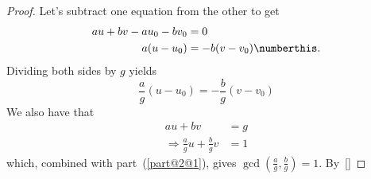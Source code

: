 \documentclass[
  coursecode={MTHE 418},
  assignmentname={Homework \homeworknumber},
  studentnumber=20053722,
  name={Bryan Hoang},
  draft,
]{
  ltxanswer%
}
\begin{document}
\begin{questions}
\begin{parts}
      \part{}
      \begin{solution}

      \end{solution}

      \part{}
      \begin{solution}
        \begin{proof}
          Let's subtract one equation from the other to get
          \begin{align*}
            au + bv - au_{0} - bv_{0} &= 0                                                      \\
            a(u - u_{0})              &= -b(v - v_{0})\numberthis\label{eq:subtract-equations}.
          \end{align*}
          Dividing both sides by \(g\) yields
          \begin{equation}\label{eq:divide-by-g}
            \frac{a}{g}(u - u_{0}) = -\frac{b}{g}(v - v_{0})
          \end{equation}
          We also have that
          \begin{align*}
            au + bv                                 &= g \\
            \Rightarrow \frac{a}{g}u + \frac{b}{g}v &= 1
          \end{align*}
          which, combined with part~(\ref{part@2@1}), gives \(\gcd(\frac{a}{g}, \frac{b}{g}) = 1\). By~\eqref{}
        \end{proof}
      \end{solution}
    \end{parts}

    \question{}
    \begin{solution}

    \end{solution}

    \question{}
    \begin{solution}

    \end{solution}

    \question{}
    \begin{solution}

    \end{solution}


\end{questions}
\end{document}
